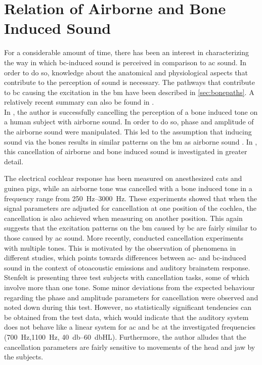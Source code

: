 \section{Relation of Airborne and Bone Induced Sound}
For a considerable amount of time, there has been an interest in characterizing the way in which \gls{bc}-induced sound is perceived in comparison to \gls{ac} sound. In order to do so, knowledge about the anatomical and physiological aspects that contribute to the perception of sound is necessary.
The pathways that contribute to \gls{bc} causing the excitation in the \gls{bm} have been described in \ref{sec:bonepaths}. A relatively recent summary can also be found in \citep{dauman_2013}.\\
In \citep{bekesy_1932}, the author is successfully cancelling the perception of a bone induced tone on a human subject with airborne sound. In order to do so, phase and amplitude of the airborne sound were manipulated. This led to the assumption that inducing sound via the bones results in similar patterns on the \gls{bm} as airborne sound \citep{stenfelt_2007}.
In \citep{lowy_1942}, this cancellation of airborne and bone induced sound is investigated in greater detail. 

The electrical cochlear response has been measured on anesthesized cats and guinea pigs, while an airborne tone was cancelled with a bone induced tone in a frequency range from \SIrange{250}{3000}{\hertz}. These experiments showed that when the signal parameters are adjusted for cancellation at one position of the cochlea, the cancellation is also achieved when measuring on another position. This again suggests that the excitation patterns on the \gls{bm} caused by \gls{bc} are fairly similar to those caused by \gls{ac} sound. More recently, \citep{stenfelt_2007} conducted cancellation experiments with multiple tones. This is motivated by the observation of phenomena in different studies, which points towards differences between \gls{ac}- and \gls{bc}-induced sound in the context of otoacoustic emissions and auditory brainstem response. 
Stenfelt \citep{stenfelt_2007} is presenting three test subjects with cancellation tasks, some of which involve more than one tone. Some minor deviations from the expected behaviour regarding the phase and amplitude parameters for cancellation were observed and noted down during this test. However, no statistically significant tendencies can be obtained from the test data, which would indicate that the auditory system does not behave like a linear system for \gls{ac} and \gls{bc} at the investigated frequencies (\SI{700}{\hertz},\SI{1100}{\hertz}, \SIrange{40}{60}{\decibel}HL).
Furthermore, the author alludes that the cancellation parameters are fairly sensitive to movements of the head and jaw by the subjects. 